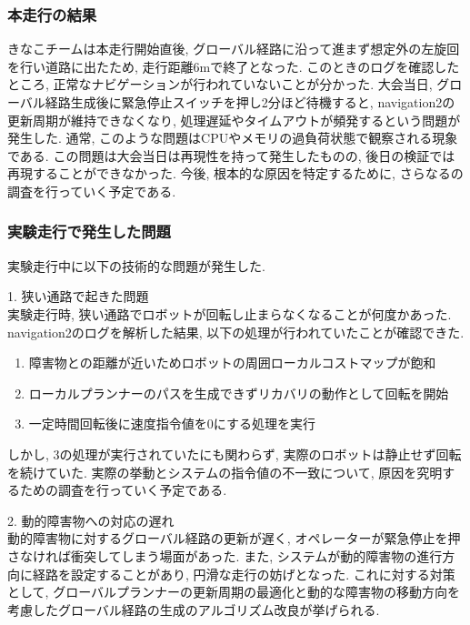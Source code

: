\subsubsection{本走行の結果}
きなこチームは本走行開始直後, グローバル経路に沿って進まず想定外の左旋回を行い道路に出たため, 走行距離6mで終了となった. 
このときのログを確認したところ, 正常なナビゲーションが行われていないことが分かった. 
大会当日, グローバル経路生成後に緊急停止スイッチを押し2分ほど待機すると, navigation2の更新周期が維持できなくなり, 処理遅延やタイムアウトが頻発するという問題が発生した. 
通常, このような問題はCPUやメモリの過負荷状態で観察される現象である. 
この問題は大会当日は再現性を持って発生したものの, 後日の検証では再現することができなかった. 
今後, 根本的な原因を特定するために, さらなるの調査を行っていく予定である. 

\subsubsection{実験走行で発生した問題}
実験走行中に以下の技術的な問題が発生した. 

1. 狭い通路で起きた問題\\
実験走行時, 狭い通路でロボットが回転し止まらなくなることが何度かあった. 
navigation2のログを解析した結果, 以下の処理が行われていたことが確認できた. 

\begin{enumerate}
  \item 障害物との距離が近いためロボットの周囲ローカルコストマップが飽和
  \item ローカルプランナーのパスを生成できずリカバリの動作として回転を開始
  \item  一定時間回転後に速度指令値を0にする処理を実行
\end{enumerate}

しかし, 3の処理が実行されていたにも関わらず, 実際のロボットは静止せず回転を続けていた. 
実際の挙動とシステムの指令値の不一致について, 原因を究明するための調査を行っていく予定である. 

2. 動的障害物への対応の遅れ\\
動的障害物に対するグローバル経路の更新が遅く, オペレーターが緊急停止を押さなければ衝突してしまう場面があった. 
また, システムが動的障害物の進行方向に経路を設定することがあり, 円滑な走行の妨げとなった. 
これに対する対策として, グローバルプランナーの更新周期の最適化と動的な障害物の移動方向を考慮したグローバル経路の生成のアルゴリズム改良が挙げられる. 

